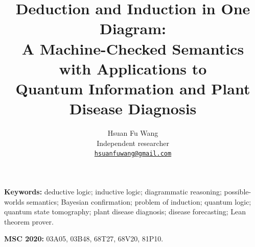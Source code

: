 \documentclass[11pt]{article}
\title{Deduction and Induction in One Diagram:\\ A Machine-Checked Semantics with Applications to\\ Quantum Information and Plant Disease Diagnosis}
\author{Hsuan Fu Wang\\[2pt]
  {\small Independent researcher}\\
  {\small\href{mailto:hsuanfuwang@gmail.com}{\texttt{hsuanfuwang@gmail.com}}}}
\date{}
\begin{document}
\maketitle

\medskip
\noindent\textbf{Keywords:} deductive logic; inductive logic; diagrammatic reasoning;
possible-worlds semantics; Bayesian confirmation; problem of induction; quantum logic;
quantum state tomography; plant disease diagnosis; disease forecasting; Lean theorem prover.

\smallskip
\noindent\textbf{MSC 2020:} 03A05, 03B48, 68T27, 68V20, 81P10.









\appendix



\end{document}
